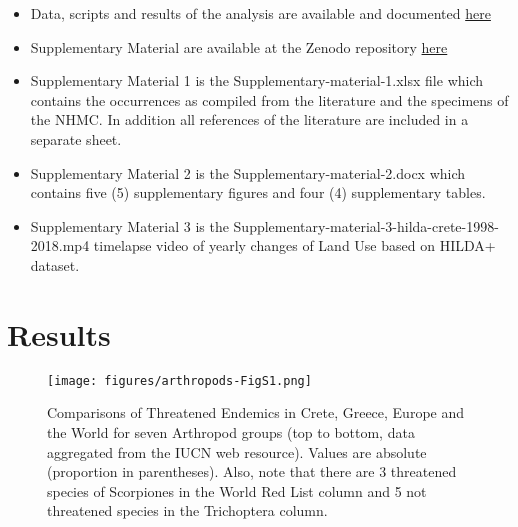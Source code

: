 \begin{itemize}
    \item Data, scripts and results of the analysis are available and documented \href{https://github.com/savvas-paragkamian/arthropods_assessment_crete}{here} 

    \item Supplementary Material are available at the Zenodo repository \href{https://doi.org/10.5281/zenodo.10635645}{here} 

    \item Supplementary Material 1 is the Supplementary-material-1.xlsx file which
contains the occurrences as compiled from the literature and the specimens of the
NHMC. In addition all references of the literature are included in a separate sheet.

    \item Supplementary Material 2 is the Supplementary-material-2.docx which
contains five (5) supplementary figures and four (4) supplementary tables.
    \item Supplementary Material 3 is the
Supplementary-material-3-hilda-crete-1998-2018.mp4 timelapse video of yearly
changes of Land Use based on HILDA+ dataset.

\end{itemize}

\section{Results}
\label{sec:arthropods-results}

   \begin{figure}[ht]
      \centering
      \texttt{[image: figures/arthropods-FigS1.png]}
      \caption[Comparisons of Threatened Endemics in Crete, Greece, Europe and the World]{Comparisons of Threatened Endemics in Crete, Greece, Europe and the World for seven Arthropod groups (top to bottom, data aggregated from the IUCN web resource). Values are absolute (proportion in parentheses). Also, note that there are 3 threatened species of Scorpiones in the World Red List column and 5 not threatened species in the Trichoptera column.}
      \label{fig:arthropods-figS1}
   \end{figure}

